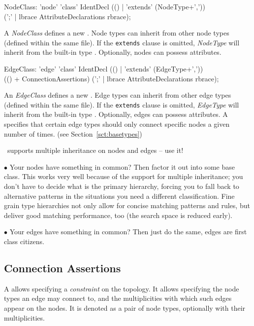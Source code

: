 \begin{rail}
  NodeClass: 'node' 'class' IdentDecl (() | 'extends' (NodeType+',')) \\
    (';' | lbrace AttributeDeclarations rbrace);
\end{rail}
A \emph{NodeClass} defines a new .
Node types can inherit from other node types (defined within the same file).
If the \texttt{extends} clause is omitted, \emph{NodeType} will inherit from the built-in type \texttt{}.
Optionally, nodes can possess attributes.

\begin{rail}
  EdgeClass: 'edge' 'class' IdentDecl (() | 'extends' (EdgeType+',')) \\
    (() + ConnectionAssertions) (';' | lbrace AttributeDeclarations rbrace);
\end{rail}
An \emph{EdgeClass} defines a new .
Edge types can inherit from other edge types (defined within the same file).
If the \texttt{extends} clause is omitted, \emph{EdgeType} will inherit from the built-in type \texttt{}.
Optionally, edges can possess attributes.
A  specifies that certain edge types should only connect specific nodes a given number of times.
(see Section~\ref{sct:basetypes})

\begin{note}
\GrG~supports multiple inheritance on nodes and edges -- use it!

$\bullet$ Your nodes have something in common?
Then factor it out into some base class.
This works very well because of the support for multiple inheritance; you don't have to decide what is the primary hierarchy, forcing you to fall back to alternative patterns in the situations you need a different classification.
Fine grain type hierarchies not only allow for concise matching patterns and rules,
but deliver good matching performance, too (the search space is reduced early).

$\bullet$ Your edges have something in common?
Then just do the same, edges are first class citizens.
\end{note}

\pagebreak

\subsection*{Connection Assertions}
A \emph{} allows specifying a \emph{constraint} on the topology.
It allows specifying the node types an edge may connect to, and the multiplicities with which such edges appear on the nodes.
It is denoted as a pair of node types, optionally with their multiplicities.

